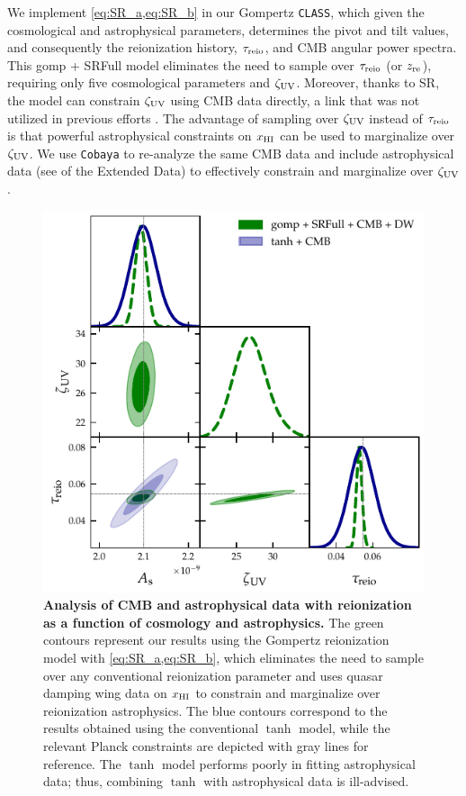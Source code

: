 We implement \cref{eq:SR_a,eq:SR_b} in our Gompertz \texttt{CLASS},
which given the cosmological and astrophysical parameters, determines
the pivot and tilt values, and consequently the reionization history,
$\tau_{\mathrm{reio}}$, and CMB angular power spectra.
This gomp + SRFull model eliminates the need to sample over $\tau_{\mathrm{reio}}$
(or $z_{\mathrm{re}}$), requiring only five cosmological parameters and $\zeta_\mathrm{UV}$.
Moreover, thanks to SR, the model can constrain $\zeta_\mathrm{UV}$ using CMB data
directly, a link that was not utilized in previous efforts
\cite{Greig2017}.
The advantage of sampling over $\zeta_\mathrm{UV}$ instead of $\tau_{\mathrm{reio}}$ is that
powerful astrophysical constraints on $x_{\mathrm{HI}}$ can be used to marginalize 
over $\zeta_\mathrm{UV}$.
We use \texttt{Cobaya} to re-analyze the same CMB data and include
astrophysical data (see  of the Extended Data) to
effectively constrain and marginalize over $\zeta_\mathrm{UV}$.

\begin{figure}[tb]
\centering
\includegraphics[width=0.7\linewidth]{figs/gomp1dw_tanh_triangle_kill.pdf}
\caption{\textbf{Analysis of CMB and astrophysical data with
reionization as a function of cosmology and astrophysics.}
The green contours represent our results using the Gompertz reionization
model with \cref{eq:SR_a,eq:SR_b}, which eliminates the need to sample
over any conventional reionization parameter and uses quasar damping
wing data on $x_{\mathrm{HI}}$ to constrain and marginalize over reionization
astrophysics.
The blue contours correspond to the results obtained using the
conventional $\tanh$ model, while the relevant Planck constraints
\cite{Planck2020a} are depicted with gray lines for reference.
The $\tanh$ model performs poorly in fitting astrophysical data; thus,
combining $\tanh$ with astrophysical data is ill-advised.}
\label{fig:kill}
\end{figure}

